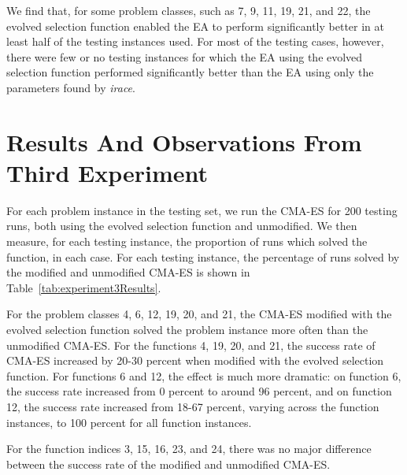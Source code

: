 \documentclass[times,12pt,titlepage]{mstogs}
\begin{document}
\begin{ThesisBody}
\begin{table}
\begin{tabular}{c|c}
  \bottomrule
\end{tabular}
\end{table}

We find that, for some problem classes, such as 7, 9, 11, 19, 21, and 22, the evolved selection function enabled the EA to perform significantly better in at least half of the testing instances used. For most of the testing cases, however, there were few or no testing instances for which the EA using the evolved selection function performed significantly better than the EA using only the parameters found by \textit{irace}. 

\section{Results And Observations From Third Experiment}
\label{thirdExperimentResults}

For each problem instance in the testing set, we run the CMA-ES for 200 testing runs, both using the evolved selection function and unmodified. We then measure, for each testing instance, the proportion of runs which solved the function, in each case. For each testing instance, the percentage of runs solved by the modified and unmodified CMA-ES is shown in Table~\ref{tab:experiment3Results}.

For the problem classes 4, 6, 12, 19, 20, and 21, the CMA-ES modified with the evolved selection function solved the problem instance more often than the unmodified CMA-ES. For the functions 4, 19, 20, and 21, the success rate of CMA-ES increased by 20-30 percent when modified with the evolved selection function. For functions 6 and 12, the effect is much more dramatic: on function 6, the success rate increased from 0 percent to around 96 percent, and on function 12, the success rate increased from 18-67 percent, varying across the function instances, to 100 percent for all function instances.

For the function indices 3, 15, 16, 23, and 24, there was no major difference between the success rate of the modified and unmodified CMA-ES.


\end{ThesisBody}
\end{document}
